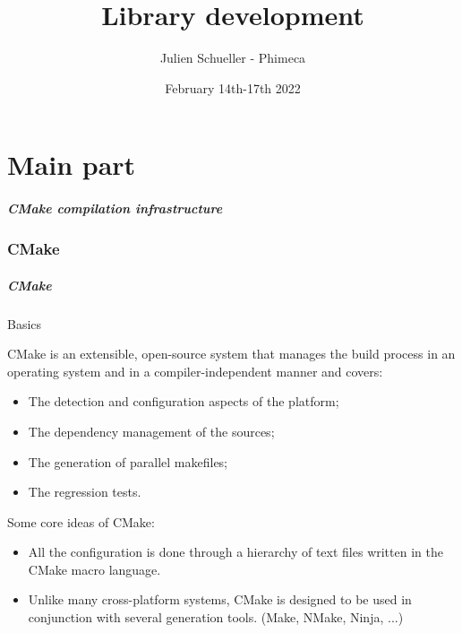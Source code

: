 \documentclass[8pt]{beamer}
\title{Library development}
\author{Julien Schueller - Phimeca}
\date{February 14th-17th 2022}
\institute{\small OpenTURNS Consortium}
\begin{document}
\frame{\titlepage}

\part{Main part}

\begin{frame}
  \frametitle{CMake compilation infrastructure}
  \tableofcontents[part=1]
\end{frame}

\section[CMake]{CMake}
\begin{frame}
  \frametitle{CMake}
  \begin{block}{Basics}

  CMake is an extensible, open-source system that manages the build process in an operating system and in a compiler-independent manner and covers:
  
\begin{itemize}
  \item The detection and configuration aspects of the platform;

  \item The dependency management of the sources;

  \item The generation of parallel makefiles;

  \item The regression tests.
\end{itemize}

Some core ideas of CMake:
\begin{itemize}
  \item All the configuration is done through a hierarchy of text files written in the CMake macro language.
  
  \item Unlike many cross-platform systems, CMake is designed to be used in conjunction with several generation tools.
  (Make, NMake, Ninja, ...)
\end{itemize}

  \end{block}
\end{frame}
\end{document}
